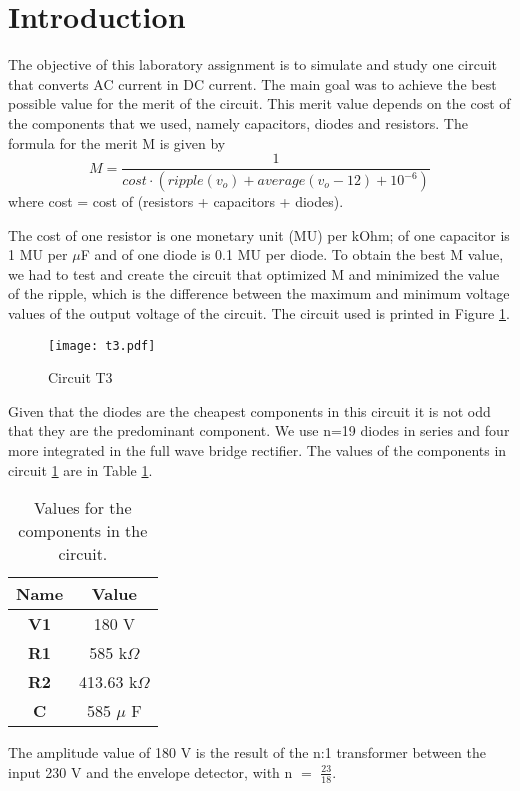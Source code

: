 \section{Introduction}
\label{sec:introduction}

The objective of this laboratory assignment is to simulate and study one circuit that converts AC current in DC current. The main goal was to achieve the best possible value for the merit of the circuit. This merit value depends on the cost of the components that we used, namely capacitors, diodes and resistors. The formula for the merit M is given by 
\begin{equation}
   M= \frac{1}{cost \cdot (ripple(v_o)+average (v_o-12)+ 10^{-6})}
\end{equation}
where cost = cost of (resistors + capacitors + diodes).

The cost of one resistor is one monetary unit (MU) per kOhm; of one capacitor is 1 MU per $\mu$F and of one diode is 0.1 MU per diode. To obtain the best M value, we had to test and create the circuit that optimized M and minimized the value of the ripple, which is the difference between the maximum and minimum voltage values of the output voltage of the circuit. The circuit used is printed in Figure \ref{circuit}.

\begin{figure}[!htp] \centering
\texttt{[image: t3.pdf]}
\caption{Circuit T3}
\label{circuit}
\end{figure}
\FloatBarrier

Given that the diodes are the cheapest components in this circuit it is not odd that they are the predominant component. We use n=19 diodes in series and four more integrated in the full wave bridge rectifier. The values of the components in circuit \ref{circuit} are in Table \ref{tab_valores}.
\begin{table}[H]
\centering
    \begin{tabular}{c|c}
      \textbf{Name} & Value\\
      \hline
      \textbf{V1} & 180 V\\
      \textbf{R1} & 585 k$\Omega$\\
      \textbf{R2} & 413.63 k$\Omega$\\
      \textbf{C} & 585 $\mu$ F\\
    \end{tabular}
    \caption{Values for the components in the circuit.}
 \label{tab_valores}
\end{table}               
\FloatBarrier

The amplitude value of 180 V is the result of the n:1 transformer between the input 230 V and the envelope detector, with n $=$ $\frac{23}{18}$. 
